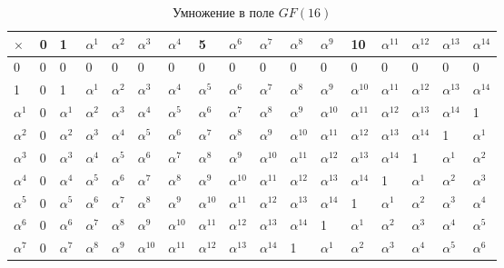 \begin{table}[h!]
  \caption{Умножение в поле $GF(16)$}
  \label{tab:times_gf16}

  \scriptsize
  \begin{tabular}{|l|l|l|l|l|l|l|l|l|l|l|l|l|l|l|l|l|}
    \hline
    $\times$ & 0 & 1 & $\alpha^1$ & $\alpha^2$ & $\alpha^3$ & $\alpha^4$ & 5 & $\alpha^6$ & $\alpha^7$ & $\alpha^8$ & $\alpha^9$ & 10 & $\alpha^{11}$ & $\alpha^{12}$ & $\alpha^{13}$ & $\alpha^{14}$ \\
    \hline
    0 & 0 & 0 & 0 & 0 & 0 & 0 & 0 & 0 & 0 & 0 & 0 & 0 & 0 & 0 & 0 & 0 \\
    \hline
    1 & 0 & 1 & $\alpha^1$ & $\alpha^2$ & $\alpha^3$ & $\alpha^4$ & $\alpha^5$ & $\alpha^6$ & $\alpha^7$ & $\alpha^8$ & $\alpha^9$ & $\alpha^{10}$ & $\alpha^{11}$ & $\alpha^{12}$ & $\alpha^{13}$ & $\alpha^{14}$ \\
    \hline
    $\alpha^1$ & 0 & $\alpha^1$ & $\alpha^2$ & $\alpha^3$ & $\alpha^4$ & $\alpha^5$ & $\alpha^6$ & $\alpha^7$ & $\alpha^8$ & $\alpha^9$ & $\alpha^{10}$ & $\alpha^{11}$ & $\alpha^{12}$ & $\alpha^{13}$ & $\alpha^{14}$ & 1 \\
    \hline
    $\alpha^2$ & 0 & $\alpha^2$ & $\alpha^3$ & $\alpha^4$ & $\alpha^5$ & $\alpha^6$ & $\alpha^7$ & $\alpha^8$ & $\alpha^9$ & $\alpha^{10}$ & $\alpha^{11}$ & $\alpha^{12}$ & $\alpha^{13}$ & $\alpha^{14}$ & 1 & $\alpha^1$ \\
    \hline
    $\alpha^3$ & 0 & $\alpha^3$ & $\alpha^4$ & $\alpha^5$ & $\alpha^6$ & $\alpha^7$ & $\alpha^8$ & $\alpha^9$ & $\alpha^{10}$ & $\alpha^{11}$ & $\alpha^{12}$ & $\alpha^{13}$ & $\alpha^{14}$ & 1 & $\alpha^1$ & $\alpha^2$ \\
    \hline
    $\alpha^4$ & 0 & $\alpha^4$ & $\alpha^5$ & $\alpha^6$ & $\alpha^7$ & $\alpha^8$ & $\alpha^9$ & $\alpha^{10}$ & $\alpha^{11}$ & $\alpha^{12}$ & $\alpha^{13}$ & $\alpha^{14}$ & 1 & $\alpha^1$ & $\alpha^2$ & $\alpha^3$ \\
    \hline
    $\alpha^5$ & 0 & $\alpha^5$ & $\alpha^6$ & $\alpha^7$ & $\alpha^8$ & $\alpha^9$ & $\alpha^{10}$ & $\alpha^{11}$ & $\alpha^{12}$ & $\alpha^{13}$ & $\alpha^{14}$ & 1 & $\alpha^1$ & $\alpha^2$ & $\alpha^3$ & $\alpha^4$ \\
    \hline
    $\alpha^6$ & 0 & $\alpha^6$ & $\alpha^7$ & $\alpha^8$ & $\alpha^9$ & $\alpha^{10}$ & $\alpha^{11}$ & $\alpha^{12}$ & $\alpha^{13}$ & $\alpha^{14}$ & 1 & $\alpha^1$ & $\alpha^2$ & $\alpha^3$ & $\alpha^4$ & $\alpha^5$ \\
    \hline
    $\alpha^7$ & 0 & $\alpha^7$ & $\alpha^8$ & $\alpha^9$ & $\alpha^{10}$ & $\alpha^{11}$ & $\alpha^{12}$ & $\alpha^{13}$ & $\alpha^{14}$ & 1 & $\alpha^1$ & $\alpha^2$ & $\alpha^3$ & $\alpha^4$ & $\alpha^5$ & $\alpha^6$ \\

\end{tabular}
\end{table}
